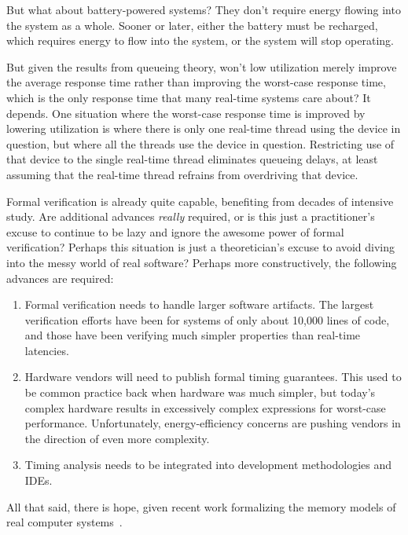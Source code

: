 \begin{enumerate}
\QuickQ{}
	But what about battery-powered systems?
	They don't require energy flowing into the system as a whole.
\QuickA{}
	Sooner or later, either the battery must be recharged, which
	requires energy to flow into the system, or the system will
	stop operating.

\QuickQ{}
	But given the results from queueing theory, won't low utilization
	merely improve the average response time rather than improving
	the worst-case response time, which is the only response time
	that many real-time systems care about?
\QuickA{}
	It depends.
	One situation where the worst-case response time is improved by
	lowering utilization is where there is only one real-time thread
	using the device in question, but where all the threads use
	the device in question.
	Restricting use of that device to the single real-time thread
	eliminates queueing delays, at least assuming that the
	real-time thread refrains from overdriving that device.

\QuickQ{}
	Formal verification is already quite capable, benefiting from
	decades of intensive study.
	Are additional advances \emph{really} required, or is this
	just a practitioner's excuse to continue to be lazy and ignore
	the awesome power of formal verification?
\QuickA{}
	Perhaps this situation is just a theoretician's excuse to avoid
	diving into the messy world of real software?
	Perhaps more constructively, the following advances are required:

	\begin{enumerate}
	\item	Formal verification needs to handle larger software
		artifacts.
		The largest verification efforts have been for systems
		of only about 10,000 lines of code, and those have been
		verifying much simpler properties than real-time latencies.
	\item	Hardware vendors will need to publish formal timing
		guarantees.
		This used to be common practice back when hardware was
		much simpler, but today's complex hardware results in
		excessively complex expressions for worst-case performance.
		Unfortunately, energy-efficiency concerns are pushing
		vendors in the direction of even more complexity.
	\item	Timing analysis needs to be integrated into development
		methodologies and IDEs.
	\end{enumerate}

	All that said, there is hope, given recent work formalizing
	the memory models of real computer
	systems~\cite{JadeAlglave2011ppcmem,Alglave:2013:SVW:2450268.2450306}.


\end{enumerate}
